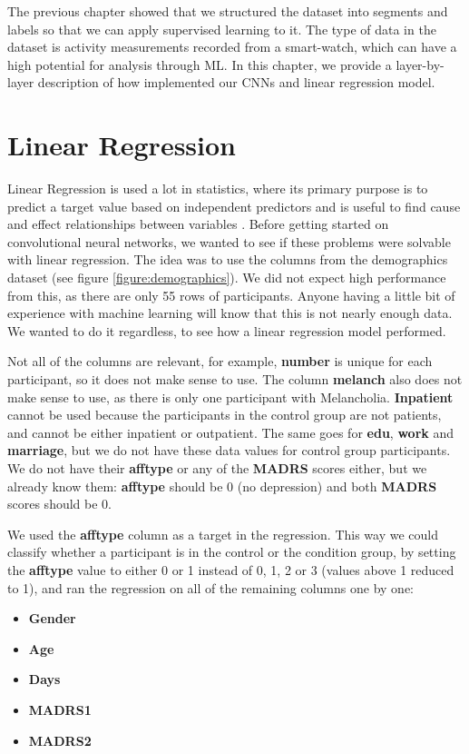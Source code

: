 The previous chapter showed that we structured the dataset into segments and labels so that we can apply supervised learning to it. The type of data in the dataset is activity measurements recorded from a smart-watch, which can have a high potential for analysis through ML. In this chapter, we provide a layer-by-layer description of how implemented our CNNs and linear regression model.

\section{Linear Regression}

Linear Regression is used a lot in statistics, where its primary purpose is to predict a target value based on independent predictors and is useful to find cause and effect relationships between variables \cite{linear_regression}. Before getting started on convolutional neural networks, we wanted to see if these problems were solvable with linear regression. The idea was to use the columns from the demographics dataset (see figure \ref{figure:demographics}). We did not expect high performance from this, as there are only 55 rows of participants. Anyone having a little bit of experience with machine learning will know that this is not nearly enough data. We wanted to do it regardless, to see how a linear regression model performed.

Not all of the columns are relevant, for example, \textbf{number} is unique for each participant, so it does not make sense to use. The column \textbf{melanch} also does not make sense to use, as there is only one participant with Melancholia. \textbf{Inpatient} cannot be used because the participants in the control group are not patients, and cannot be either inpatient or outpatient. The same goes for \textbf{edu}, \textbf{work} and \textbf{marriage}, but we do not have these data values for control group participants. We do not have their \textbf{afftype} or any of the \textbf{MADRS} scores either, but we already know them: \textbf{afftype} should be 0 (no depression) and both \textbf{MADRS} scores should be 0. 

We used the \textbf{afftype} column as a target in the regression. This way we could classify whether a participant is in the control or the condition group, by setting the \textbf{afftype} value to either 0 or 1 instead of 0, 1, 2 or 3 (values above 1 reduced to 1), and ran the regression on all of the remaining columns one by one:

\begin{itemize}
      \item \textbf{Gender}
      \item \textbf{Age}
      \item \textbf{Days}
      \item \textbf{MADRS1}
      \item \textbf{MADRS2}
\end{itemize}

